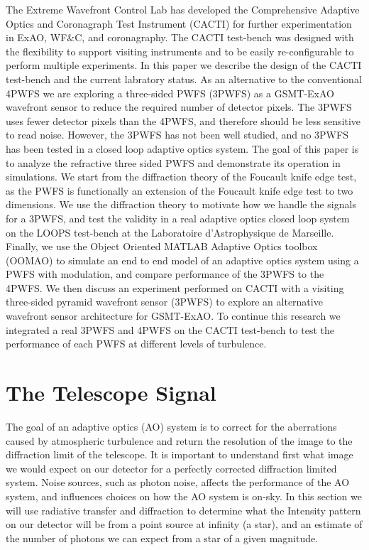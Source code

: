  The Extreme Wavefront Control Lab has developed the Comprehensive Adaptive Optics and Coronagraph Test Instrument (CACTI) for further experimentation in ExAO, WF$\&$C, and coronagraphy. The CACTI test-bench was designed with the flexibility to support visiting instruments and to be easily re-configurable to perform multiple experiments. In this paper we describe the design of the CACTI test-bench and the current labratory status. As an alternative to the conventional 4PWFS we are exploring a three-sided PWFS (3PWFS) as a GSMT-ExAO wavefront sensor to reduce the required number of detector pixels. The 3PWFS uses fewer detector pixels than the 4PWFS, and therefore should be less sensitive to read noise. However, the 3PWFS has not been well studied, and no 3PWFS has been tested in a closed loop adaptive optics system. The goal of this paper is to analyze the refractive three sided PWFS and demonstrate its operation in simulations. We start from the diffraction theory of the Foucault knife edge test, as the PWFS is functionally an extension of the Foucault knife edge test to two dimensions. We use the diffraction theory to motivate how we handle the signals for a 3PWFS, and test the validity in a real adaptive optics closed loop system on the LOOPS\cite{janin2019adaptive} test-bench at the Laboratoire d'Astrophysique de Marseille. Finally, we use the Object Oriented MATLAB Adaptive Optics toolbox (OOMAO)\cite{OOMAO} to simulate an end to end model of an adaptive optics system using a PWFS with modulation, and compare performance of the 3PWFS to the 4PWFS. We then discuss an experiment performed on CACTI with a visiting three-sided pyramid wavefront sensor (3PWFS) to explore an alternative wavefront sensor architecture for GSMT-ExAO. To continue this research we integrated a real 3PWFS and 4PWFS on the CACTI test-bench to test the performance of each PWFS at different levels of turbulence.







 
\section{The Telescope Signal}

The goal of an adaptive optics (AO) system is to correct for the aberrations caused by atmospheric turbulence and return the resolution of the image to the diffraction limit of the telescope. It is important to understand first what image we would expect on our detector for a perfectly corrected diffraction limited system. Noise sources, such as photon noise, affects the performance of the AO system, and influences choices on how the AO system is on-sky. In this section we will use radiative transfer and diffraction to determine what the Intensity pattern on our detector will be from a point source at infinity (a star), and an estimate of the number of photons we can expect from a star of a given magnitude. 

